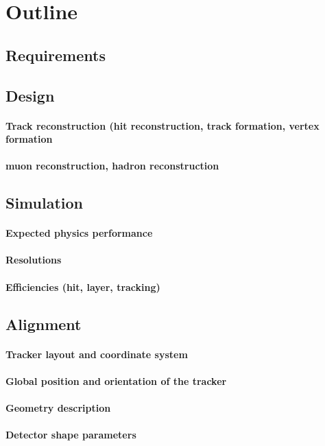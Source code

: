 \section{Outline}
\subsection{Requirements} 
\subsection{Design}
\paragraph{Track reconstruction (hit reconstruction, track formation, vertex formation}
\paragraph{muon reconstruction, hadron reconstruction}
\subsection{Simulation}
\paragraph{Expected physics performance}
\paragraph{Resolutions}
\paragraph{Efficiencies (hit, layer, tracking)}
\subsection{Alignment}
\paragraph{Tracker layout and coordinate system}
\paragraph{Global position and orientation of the tracker}
\paragraph{Geometry description}
\paragraph{Detector shape parameters}

